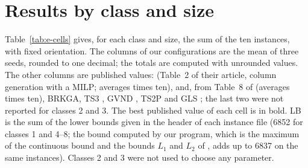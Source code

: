﻿%
\providecommand{\todo}[1]{\textcolor{red}{[TODO: #1]}}
\section{Results by class and size}
\label{app:cells}

Table~\ref{tab:e-cells} gives, for each class and size, the sum of the ten instances, with fixed orientation. The columns of our
configurations are the mean of three seeds, rounded to one decimal; the totals are computed with unrounded values. The other columns are published values:
\citet{Mahvash2018} (Table~2 of their article, column generation with a MILP; averages times ten), and, from Table~8 of \citet{Goncalves2013} (averages times ten),
BRKGA, TS3 \citep{Lodi2002}, GVND \citep{Parreno2010}, TS2P \citep{Crainic2009} and GLS \citep{Faroe2003}; the last two were not reported for classes 2 and 3.
The best published value of each cell is in bold. LB is the sum of the lower bounds given in the header of each instance file (6852 for classes 1 and 4--8;
the bound computed by our program, which is the maximum of the continuous bound and the bounds $L_1$ and $L_2$ of \citet{Martello2000}, adds up to 6837 on the same instances).
Classes 2 and 3 were not used to choose any parameter.

